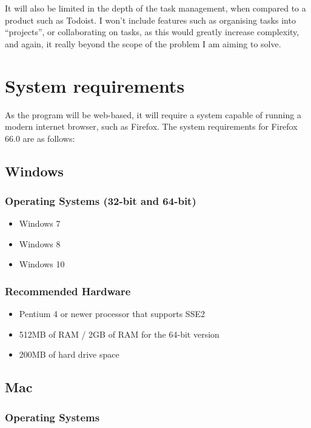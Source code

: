 \documentclass{article}
\begin{document}
It will also be limited in the depth of the task management,
when compared to a product such as Todoist.
I won't include features such as organising tasks into ``projects'',
or collaborating on tasks,
as this would greatly increase complexity,
and again,
it really beyond the scope of the problem I am aiming to solve.


\section{System requirements}
As the program will be web-based, it will require a system capable of running a
modern internet browser, such as Firefox. The system requirements for Firefox
66.0 are as follows:

\subsection*{Windows}\label{windows}

\subsubsection*{Operating Systems (32-bit and
	64-bit)}\label{operating-systems-32-bit-and-64-bit}

\begin{itemize}
	\item Windows 7
	\item Windows 8
	\item Windows 10
\end{itemize}

\subsubsection*{Recommended Hardware}\label{recommended-hardware}

\begin{itemize}
	\item Pentium 4 or newer processor that supports SSE2
	\item 512MB of RAM / 2GB of RAM for the 64-bit version
	\item 200MB of hard drive space
\end{itemize}

\subsection*{Mac}\label{mac}

\subsubsection*{Operating Systems}\label{operating-systems}
\end{document}
